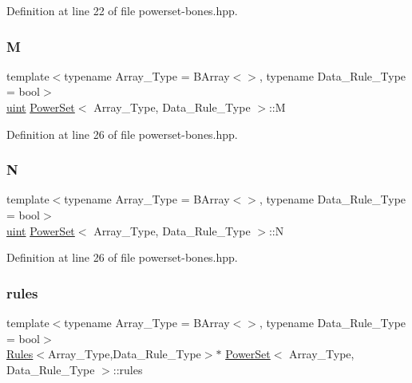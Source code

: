 Definition at line 22 of file powerset-\/bones.\+hpp.

\mbox{\label{class_power_set_a91d328d5ace1ed6a8587a66af905ae98}} 
\subsubsection{\texorpdfstring{M}{M}}
{\footnotesize\ttfamily template$<$typename Array\+\_\+\+Type  = B\+Array$<$$>$, typename Data\+\_\+\+Rule\+\_\+\+Type  = bool$>$ \\
\hyperlink{typedefs_8hpp_a91ad9478d81a7aaf2593e8d9c3d06a14}{uint} \hyperlink{class_power_set}{Power\+Set}$<$ Array\+\_\+\+Type, Data\+\_\+\+Rule\+\_\+\+Type $>$\+::M}



Definition at line 26 of file powerset-\/bones.\+hpp.

\mbox{\label{class_power_set_ab3b65c1b9bce012f4aabe5acae093acd}} 
\subsubsection{\texorpdfstring{N}{N}}
{\footnotesize\ttfamily template$<$typename Array\+\_\+\+Type  = B\+Array$<$$>$, typename Data\+\_\+\+Rule\+\_\+\+Type  = bool$>$ \\
\hyperlink{typedefs_8hpp_a91ad9478d81a7aaf2593e8d9c3d06a14}{uint} \hyperlink{class_power_set}{Power\+Set}$<$ Array\+\_\+\+Type, Data\+\_\+\+Rule\+\_\+\+Type $>$\+::N}



Definition at line 26 of file powerset-\/bones.\+hpp.

\mbox{\label{class_power_set_afa542ecc31858c8644d1e76078eb1713}} 
\subsubsection{\texorpdfstring{rules}{rules}}
{\footnotesize\ttfamily template$<$typename Array\+\_\+\+Type  = B\+Array$<$$>$, typename Data\+\_\+\+Rule\+\_\+\+Type  = bool$>$ \\
\hyperlink{class_rules}{Rules}$<$Array\+\_\+\+Type,Data\+\_\+\+Rule\+\_\+\+Type$>$$\ast$ \hyperlink{class_power_set}{Power\+Set}$<$ Array\+\_\+\+Type, Data\+\_\+\+Rule\+\_\+\+Type $>$\+::rules}



